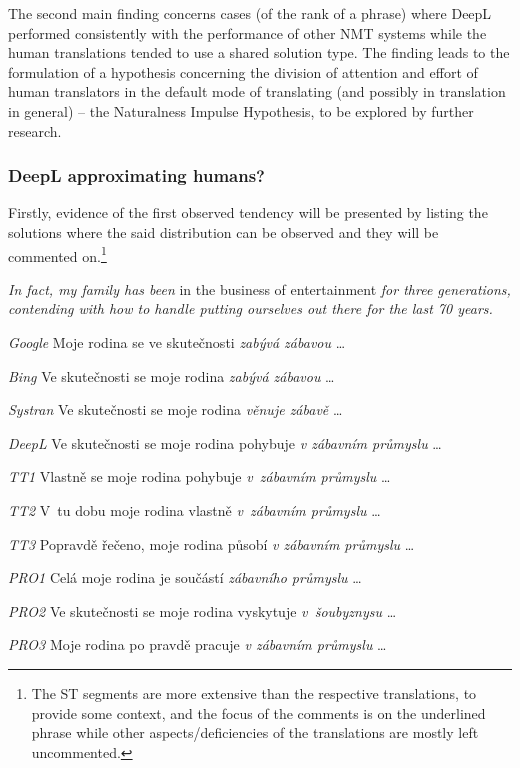 \documentclass[output=paper]{langscibook}
\begin{document}
The second main finding concerns cases (of the rank of a phrase) where DeepL performed consistently with the performance of other NMT systems while the human translations tended to use a shared solution type. The finding leads to the formulation of a hypothesis concerning the division of attention and effort of human translators in the default mode of translating (and possibly in translation in general) – the Naturalness Impulse Hypothesis, to be explored by further research.

\subsubsection{ DeepL approximating humans?}\label{sec:4.2.1}

Firstly, evidence of the first observed tendency will be presented by listing the solutions where the said distribution can be observed and they will be commented on.\footnote{The ST segments are more extensive than the respective translations, to provide some context, and the focus of the comments is on the underlined phrase while other aspects/deficiencies of the translations are mostly left uncommented.}

\ea \label{ex:kamenicka:1}

\textit{In fact, my family has been} in the business of entertainment \textit{for three generations, contending with how to handle putting ourselves out there for the last 70 years.}

\textit{Google} Moje rodina se ve skutečnosti \textit{zabývá zábavou} …

\textit{Bing} Ve skutečnosti se moje rodina \textit{zabývá zábavou} …

\textit{Systran} Ve skutečnosti se moje rodina \textit{věnuje zábavě} …

\textit{DeepL} Ve skutečnosti se moje rodina pohybuje \textit{v zábavním průmyslu} …

\textit{TT1} Vlastně se moje rodina pohybuje \textit{v~zábavním průmyslu} …

\textit{TT2} V~tu dobu moje rodina vlastně \textit{v~zábavním průmyslu} …

\textit{TT3} Popravdě řečeno, moje rodina působí \textit{v zábavním průmyslu} …

\textit{PRO1} Celá moje rodina je součástí \textit{zábavního průmyslu} …

\textit{PRO2} Ve skutečnosti se moje rodina vyskytuje \textit{v~šoubyznysu} …

\textit{PRO3} Moje rodina po pravdě pracuje \textit{v zábavním průmyslu} …
\end{document}
